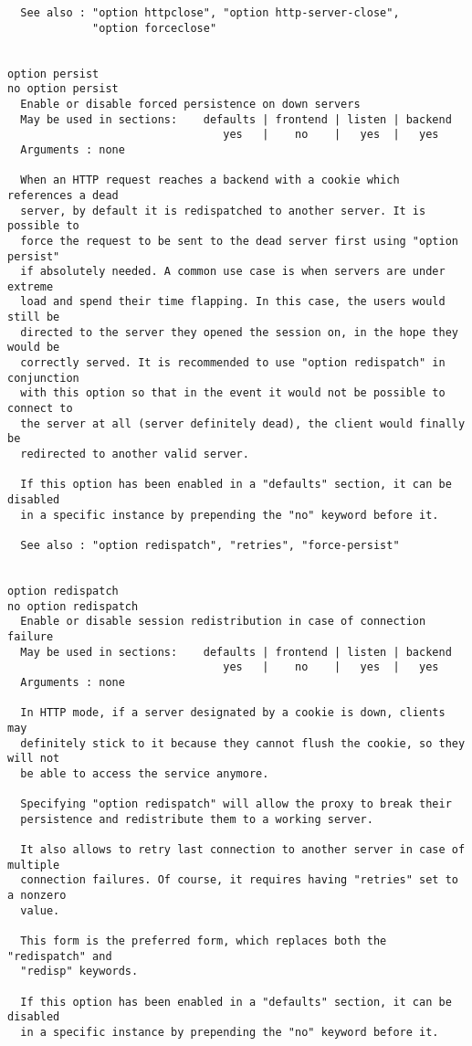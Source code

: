 \begin{verbatim}
  See also : "option httpclose", "option http-server-close",
             "option forceclose"


option persist
no option persist
  Enable or disable forced persistence on down servers
  May be used in sections:    defaults | frontend | listen | backend
                                 yes   |    no    |   yes  |   yes
  Arguments : none

  When an HTTP request reaches a backend with a cookie which references a dead
  server, by default it is redispatched to another server. It is possible to
  force the request to be sent to the dead server first using "option persist"
  if absolutely needed. A common use case is when servers are under extreme
  load and spend their time flapping. In this case, the users would still be
  directed to the server they opened the session on, in the hope they would be
  correctly served. It is recommended to use "option redispatch" in conjunction
  with this option so that in the event it would not be possible to connect to
  the server at all (server definitely dead), the client would finally be
  redirected to another valid server.

  If this option has been enabled in a "defaults" section, it can be disabled
  in a specific instance by prepending the "no" keyword before it.

  See also : "option redispatch", "retries", "force-persist"


option redispatch
no option redispatch
  Enable or disable session redistribution in case of connection failure
  May be used in sections:    defaults | frontend | listen | backend
                                 yes   |    no    |   yes  |   yes
  Arguments : none

  In HTTP mode, if a server designated by a cookie is down, clients may
  definitely stick to it because they cannot flush the cookie, so they will not
  be able to access the service anymore.

  Specifying "option redispatch" will allow the proxy to break their
  persistence and redistribute them to a working server.

  It also allows to retry last connection to another server in case of multiple
  connection failures. Of course, it requires having "retries" set to a nonzero
  value.

  This form is the preferred form, which replaces both the "redispatch" and
  "redisp" keywords.

  If this option has been enabled in a "defaults" section, it can be disabled
  in a specific instance by prepending the "no" keyword before it.


\end{verbatim}

